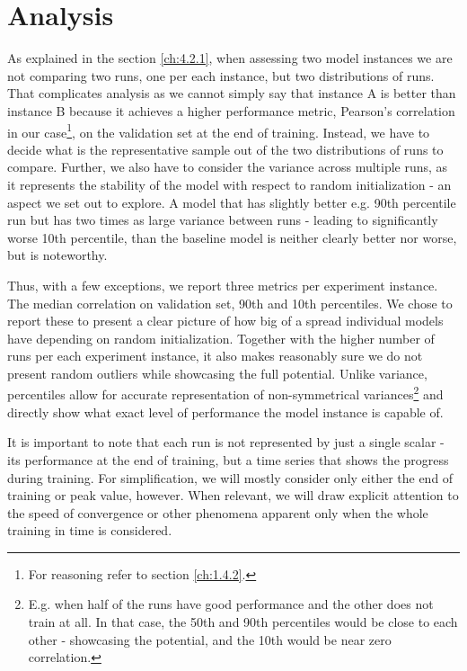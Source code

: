 \section{Analysis}\label{ch:4.3.1}

As explained in the section \ref{ch:4.2.1}, when assessing two model instances we are not comparing two runs, one per each instance, but two distributions of runs. That complicates analysis as we cannot simply say that instance A is better than instance B because it achieves a higher performance metric, Pearson’s correlation in our case\footnote{For reasoning refer to section \ref{ch:1.4.2}.}, on the validation set at the end of training. Instead, we have to decide what is the representative sample out of the two distributions of runs to compare. Further, we also have to consider the variance across multiple runs, as it represents the stability of the model with respect to random initialization - an aspect we set out to explore. A model that has slightly better e.g. 90th percentile run but has two times as large variance between runs - leading to significantly worse 10th percentile, than the baseline model is neither clearly better nor worse, but is noteworthy. 

Thus, with a few exceptions, we report three metrics per experiment instance. The median correlation on validation set, 90th and 10th percentiles. We chose to report these to present a clear picture of how big of a spread individual models have depending on random initialization. Together with the higher number of runs per each experiment instance, it also makes reasonably sure we do not present random outliers while showcasing the full potential. Unlike variance, percentiles allow for accurate representation of non-symmetrical variances\footnote{E.g. when half of the runs have good performance and the other does not train at all. In that case, the 50th and 90th percentiles would be close to each other - showcasing the potential, and the 10th would be near zero correlation.} and directly show what exact level of performance the model instance is capable of.

It is important to note that each run is not represented by just a single scalar - its performance at the end of training, but a time series that shows the progress during training. For simplification, we will mostly consider only either the end of training or peak value, however. When relevant, we will draw explicit attention to the speed of convergence or other phenomena apparent only when the whole training in time is considered.

